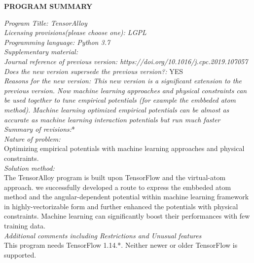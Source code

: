 \documentclass[final,3p,times]{elsarticle}
\begin{document}

{\bf PROGRAM SUMMARY} \\
\begin{small}
\noindent
{\em Program Title: TensorAlloy} \\
{\em Licensing provisions(please choose one): LGPL}             \\
{\em Programming language: Python 3.7}                          \\
{\em Supplementary material:}                                   \\
{\em Journal reference of previous version: 
https://doi.org/10.1016/j.cpc.2019.107057}                      \\
{\em Does the new version supersede the previous version?:} YES \\
{\em Reasons for the new version: This new version is a significant extension to 
the previous version. Now machine learning approaches and physical constraints 
can be used together to tune empirical potentials (for example the embbeded atom 
method). Machine learning optimized empirical potentials can be almost as 
accurate as machine learning interaction potentials but run much faster} \\
{\em Summary of revisions:}*\\
{\em Nature of problem:} \\
  Optimizing empirical potentials with machine learning approaches and physical 
  constraints. \\
{\em Solution method:} \\
  The TensorAlloy program is built upon TensorFlow and the virtual-atom 
  approach. we successfully developed a route to express the embbeded atom 
  method and the angular-dependent potential within machine learning framework 
  in highly-vectorizable form and further enhanced the potentials with physical
  constraints. Machine learning can significantly boost their performances with 
  few training data.   \\
{\em Additional comments including Restrictions and Unusual features}\\
  This program needs TensorFlow 1.14.*. Neither newer or older TensorFlow is 
  supported. \\
\end{small}


% 
%
\end{document}
